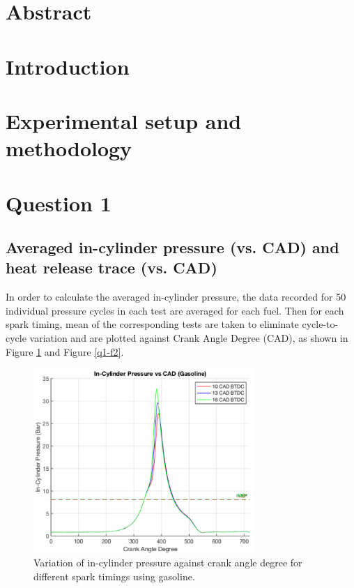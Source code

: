 \documentclass[11pt]{article}
\begin{document}
\tableofcontents
\listoffigures
\listoftables
\section{Abstract}
\section{Introduction}
\section{Experimental setup and methodology}
\section{Question 1}
\subsection*{Averaged in-cylinder pressure (vs. CAD) and heat release trace (vs. CAD)}
In order to calculate the averaged in-cylinder pressure, the data recorded for 50 individual pressure cycles in each test are averaged for each fuel. Then for each spark timing, mean of the corresponding tests are taken to eliminate cycle-to-cycle variation and are plotted against Crank Angle Degree (CAD), as shown in Figure \ref{q1-f1} and Figure \ref{q1-f2}. 
\begin{figure}[H]
    \centering
    \includegraphics[height = 7cm]{./img/diagram8.png}
    \caption{Variation of in-cylinder pressure against crank angle degree for different spark timings using gasoline.}
    \label{q1-f1}
\end{figure}
\end{document}

